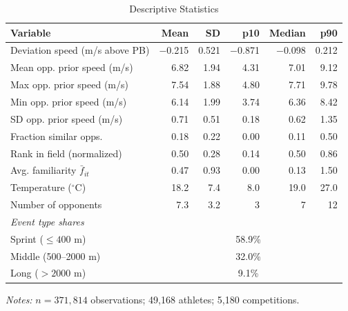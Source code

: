 \documentclass[12pt]{article}
\theoremstyle{definition}
\theoremstyle{remark}
\begin{document}
\begin{table}[H]
\centering
\begin{threeparttable}
\caption{Descriptive Statistics}
\label{tab:summary}
\begin{tabular}{lrrrrr}
\toprule
Variable & Mean & SD & p10 & Median & p90 \\
\midrule
Deviation speed (m/s above PB) & $-$0.215 & 0.521 & $-$0.871 & $-$0.098 & 0.212 \\
Mean opp. prior speed (m/s) & 6.82 & 1.94 & 4.31 & 7.01 & 9.12 \\
Max opp. prior speed (m/s) & 7.54 & 1.88 & 4.80 & 7.71 & 9.78 \\
Min opp. prior speed (m/s) & 6.14 & 1.99 & 3.74 & 6.36 & 8.42 \\
SD opp. prior speed (m/s) & 0.71 & 0.51 & 0.18 & 0.62 & 1.35 \\
Fraction similar opps. & 0.18 & 0.22 & 0.00 & 0.11 & 0.50 \\
Rank in field (normalized) & 0.50 & 0.28 & 0.14 & 0.50 & 0.86 \\
Avg. familiarity $\bar{f}_{it}$ & 0.47 & 0.93 & 0.00 & 0.13 & 1.50 \\
Temperature ($^\circ$C) & 18.2 & 7.4 & 8.0 & 19.0 & 27.0 \\
Number of opponents & 7.3 & 3.2 & 3 & 7 & 12 \\
\midrule
\multicolumn{6}{l}{\textit{Event type shares}} \\
Sprint ($\le 400$ m) & \multicolumn{5}{c}{58.9\%} \\
Middle (500--2000 m) & \multicolumn{5}{c}{32.0\%} \\
Long ($> 2000$ m) & \multicolumn{5}{c}{9.1\%} \\
\bottomrule
\end{tabular}
\begin{tablenotes}
\small
\item \textit{Notes:} $n = 371{,}814$ observations; 49{,}168 athletes; 5{,}180 competitions.
\end{tablenotes}
\end{threeparttable}
\end{table}
\end{document}
